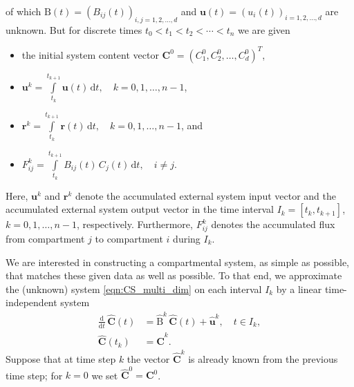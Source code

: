 \documentclass[11pt,a4paper]{article}
\renewcommand{\vec}[1]{\mathbf{#1}}
\newcommand{\tens}[1]{\mathrm{#1}}
\newcommand{\deriv}[1]{\frac{\mathrm{d}}{\mathrm{d}#1}}
\newcommand{\dd}[1]{\,\mathrm{d}#1}
\newcommand{\intl}{\int\limits}
\begin{document}
        of which $\tens{B}(t)=(B_{ij}(t))_{i,j=1,2,\ldots,d}$ and $\vec{u}(t)=(u_i(t))_{i=1,2,\ldots,d}$ are unknown.
        But for discrete times $t_0<t_1<t_2<\cdots<t_n$ we are given
        \begin{itemize}
            \item the initial system content vector $\vec{C}^0=(C^0_1,C^0_2,\ldots,C^0_d)^T$,
            \item $\vec{u}^k = \intl_{t_k}^{t_{k+1}} \vec{u}(t)\dd{t},\quad k=0,1,\ldots,n-1$, 
            \item $\vec{r}^k = \intl_{t_k}^{t_{k+1}} \vec{r}(t)\dd{t},\quad k=0,1,\ldots,n-1$, and
            \item $F_{ij}^k = \intl_{t_k}^{t_{k+1}} B_{ij}(t)\,C_j(t)\dd{t},\quad i\neq j$.
        \end{itemize}
        Here, $\vec{u}^k$ and $\vec{r}^k$ denote the accumulated external system input vector and the accumulated external system output vector in the time interval $I_k=[t_k,t_{k+1}]$, $k=0,1,\ldots,n-1$, respectively.
        Furthermore, $F^k_{ij}$ denotes the accumulated flux from compartment $j$ to compartment $i$ during $I_k$.

        We are interested in constructing a compartmental system, as simple as possible, that matches these given data as well as possible.
        To that end, we approximate the (unknown) system \eqref{eqn:CS_multi_dim} on each interval $I_k$ by a linear time-independent system
        \begin{equation}\label{eqn:CS_multi_dim_approx}
            \begin{aligned}
                \deriv{t}\,\widehat{\vec{C}}(t) &= \widehat{\tens{B}}^k\,\widehat{\vec{C}}(t) + \widehat{\vec{u}}^k,\quad t\in I_k,\\
                \widehat{\vec{C}}(t_k) &= \widehat{\vec{C}}^k.
            \end{aligned}
        \end{equation}
        Suppose that at time step $k$ the vector $\widehat{\vec{C}}^k$ is already known from the previous time step; for $k=0$ we set $\widehat{\vec{C}}^0=\vec{C}^0$.
\end{document}
